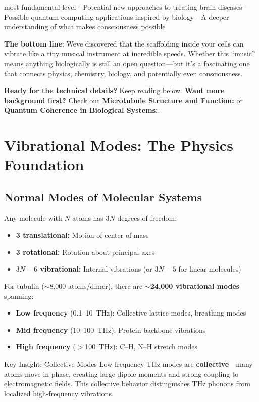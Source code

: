 most fundamental level - Potential new approaches to treating brain
diseases - Possible quantum computing applications inspired by biology -
A deeper understanding of what makes consciousness possible

\textbf{The bottom line}: We\textquotesingle ve discovered that the
scaffolding inside your cells can vibrate like a tiny musical instrument
at incredible speeds. Whether this ``music'' means anything biologically
is still an open question---but it's a fascinating
one that connects physics, chemistry, biology, and potentially even
consciousness.

\textbf{Ready for the technical details?} Keep reading below.
\textbf{Want more background first?} Check out
\textbf{Microtubule Structure and Function:} or
\textbf{Quantum Coherence in Biological Systems:}.

\section{Vibrational Modes: The Physics Foundation}
\label{sec:vibrational-modes}

\subsection{Normal Modes of Molecular Systems}
\label{subsec:normal-modes}

Any molecule with $N$ atoms has $3N$ degrees of freedom:
\begin{itemize}
\item \textbf{3 translational:} Motion of center of mass
\item \textbf{3 rotational:} Rotation about principal axes  
\item \textbf{$3N - 6$ vibrational:} Internal vibrations (or $3N - 5$ for linear molecules)
\end{itemize}

For tubulin ($\sim$8,000 atoms/dimer), there are \textbf{$\sim$24,000 vibrational modes} spanning:
\begin{itemize}
\item \textbf{Low frequency} (0.1--10~THz): Collective lattice modes, breathing modes
\item \textbf{Mid frequency} (10--100~THz): Protein backbone vibrations
\item \textbf{High frequency} ($>$100~THz): C--H, N--H stretch modes
\end{itemize}

\begin{calloutbox}{Key Insight: Collective Modes}
Low-frequency THz modes are \textbf{collective}---many atoms move in phase, creating large dipole moments and strong coupling to electromagnetic fields. This collective behavior distinguishes THz phonons from localized high-frequency vibrations.
\end{calloutbox}

